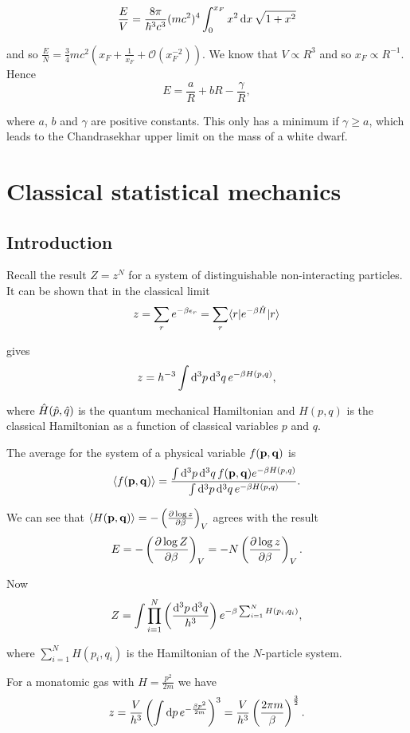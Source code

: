 \documentclass{notes}
\newcommand{\cO}{\mathcal{O}}
\newcommand{\ket}[1]{|#1\rangle}
\newcommand{\bra}[1]{\langle#1|}
\newcommand{\ave}[1]{\langle#1\rangle}
\newcommand{\pdf}[3]{\left(\pd{#1}{#2}\right)_{#3}}
\begin{document}
\[
\frac{E}{V} = \frac{8 \pi}{\hbar^3 c^3} (mc^2)^4 \int_0^{x_F} x^2\,
\mathrm{d} x\, \sqrt{1+x^2}
\]

and so $\tfrac{E}{N} = \tfrac{3}{4} m c^2\left( x_F + \tfrac{1}{x_F}
+ \cO(x_F^{-2})\right)$.  We know that $V \propto R^3$ and so $x_F \propto
R^{-1}$.  Hence
\[
E = \frac{a}{R} + b R - \frac{\gamma}{R},
\]

where $a$, $b$ and $\gamma$ are positive constants.  This only has a
minimum if $\gamma \ge a$, which leads to the Chandrasekhar upper
limit on the mass of a white dwarf.

\chapter{Classical statistical mechanics}

\section{Introduction}

Recall the result $Z = z^N$ for a system of distinguishable
non-interacting particles.  It can be shown that in the
classical limit
\[
z = \sum_r e^{-\beta \epsilon_r} = \sum_r
\bra{r} e^{-\beta \Hat H} \ket{r}
\]

gives
\begin{equation}\label{eq:smallz}
z = h^{-3} \int \mathrm{d}^3 p\, \mathrm{d}^3 q\, e^{-\beta H(p,q)},
\end{equation}

where $\Hat{H}(\Hat{p},\Hat{q})$ is the quantum mechanical
Hamiltonian and $H(p,q)$ is the classical Hamiltonian as
a function of classical variables $p$ and $q$.

The average for the system of a physical variable $f(\mathbf{p},
\mathbf{q})$ is
\[
\ave{f(\vect{p},\vect{q})}
= \frac{\int \ud^3 p\, \ud^3 q\, f(\vect{p},\vect{q}) e^{-\beta H(p,q)}}
{\int \ud^3 p\, \ud^3 q\, e^{-\beta H(p,q)}}.
\]

We can see that $\ave{H(\vect{p},\vect{q})}
= - \pdf{\log z}{\beta}{V}$ agrees with the result
\[
E = - \pdf{\log Z}{\beta}{V} = - N \pdf{\log z}{\beta}{V}.
\]

Now
\[
Z = \int \prod_{i=1}^N \left( \frac{\mathrm{d}^3 p\, \mathrm{d}^3 q}{h^3} \right)
e^{-\beta \sum_{i=1}^N H(p_i,q_i)},
\]

where $\sum_{i=1}^N H(p_i,q_i)$ is the Hamiltonian of the
$N$-particle system.

For a monatomic gas with $H = \frac{p^2}{2 m}$ we have
\[
z = \frac{V}{h^3} \left(\int \mathrm{d} p\, e^{-\frac{\beta p^2}{2 m}}
\right)^3 = \frac{V}{h^3} \left( \frac{2 \pi m}{\beta}
\right)^{\frac{3}{2}}.
\]
\end{document}
